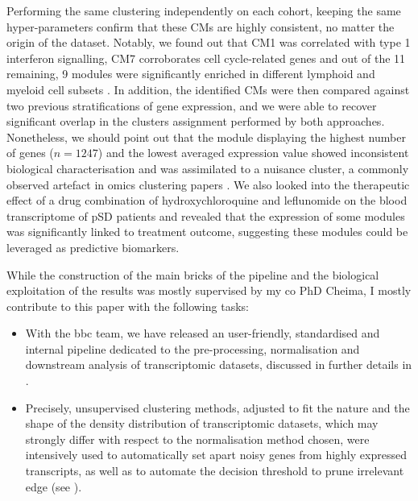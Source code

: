 \documentclass[mainlanguage=english,numlaboratories=2, nofrontcover=true,noaim=false, localbibs, colophon-location=verso-frontcover, oneside, 10pt, localtocs, version=final, nomakeabstract=true]{yathesis}
\begin{document}
{Performing the same clustering independently on each cohort, keeping the same hyper-parameters confirm that these CMs are highly consistent, no matter the origin of the dataset. Notably, we found out that CM1 was correlated with type 1 interferon signalling, CM7 corroborates cell cycle-related genes and out of the 11 remaining, 9 modules were significantly enriched in different lymphoid and myeloid cell subsets . In addition, the identified CMs were then compared against two previous stratifications of gene expression, and we were able to recover significant overlap in the clusters assignment performed by both approaches. Nonetheless, we should point out that the module displaying the highest number of genes ($n=1247$) and the lowest averaged expression value showed inconsistent biological characterisation and was assimilated to a nuisance cluster, a commonly observed artefact in omics clustering papers .
We also looked into the therapeutic effect of a drug combination of hydroxychloroquine and leflunomide on the blood transcriptome of pSD patients and revealed that the expression of some modules was significantly linked to treatment outcome, suggesting these modules could be leveraged as predictive biomarkers.


While the construction of the main bricks of the pipeline and the biological exploitation of the results was mostly supervised by my co PhD Cheima, I mostly contribute to this paper with the following tasks:

\begin{itemize}
\item With the \acrshort{bbc} team, we have released an user-friendly, standardised and internal pipeline dedicated to the pre-processing, normalisation and downstream analysis of transcriptomic datasets, discussed in further details in .

\item Precisely, unsupervised clustering methods, adjusted to fit the nature and the shape of the density distribution of transcriptomic datasets, which may strongly differ with respect to the normalisation method chosen, were intensively used to automatically set apart noisy genes from highly expressed transcripts, as well as to automate the decision threshold to prune irrelevant edge (see ).


\end{itemize}}
\end{document}
